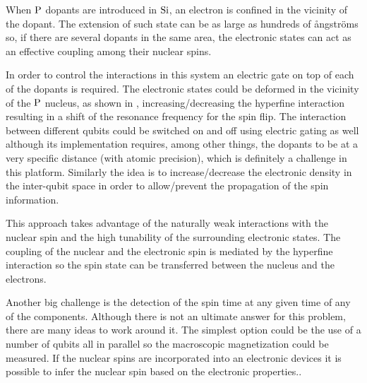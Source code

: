When $\ce{P}$ dopants are introduced in $\ce{Si}$, an electron is confined in the vicinity of the dopant. The extension of such state can be as large as hundreds of ångströms so, if there are several dopants in the same area, the electronic states can act as an effective coupling among their nuclear spins\cite{Slichter1990}.


In order to control the interactions in this system an electric gate on top of each of the dopants is required. The electronic states could be deformed in the vicinity of the $\ce{P}$ nucleus, as shown in , increasing/decreasing the hyperfine interaction resulting in a shift of the resonance frequency for the spin flip.
The interaction between different qubits could be switched on and off using electric gating as well although its implementation requires, among other things, the dopants to be at a very specific distance (with atomic precision), which is definitely a challenge in this platform. Similarly the idea is to increase/decrease the electronic density in the inter-qubit space in order to allow/prevent the propagation of the spin information.


This approach takes advantage of the naturally weak interactions with the nuclear spin and the high tunability of the surrounding electronic states.
The coupling of the nuclear and the electronic spin is mediated by the hyperfine interaction so the spin state can be transferred between the nucleus and the electrons.

Another big challenge is the detection of the spin time at any given time of any of the components. Although there is not an ultimate answer for this problem, there are many ideas to work around it. The simplest option could be the use of a number of qubits all in parallel so the macroscopic magnetization could be measured. If the nuclear spins are incorporated into an electronic devices it is possible to infer the nuclear spin based on the electronic properties.\cite{Kane1992,Wald1994,Stich1996,Dixon1997,Dobers1988,Stegner2006}.

